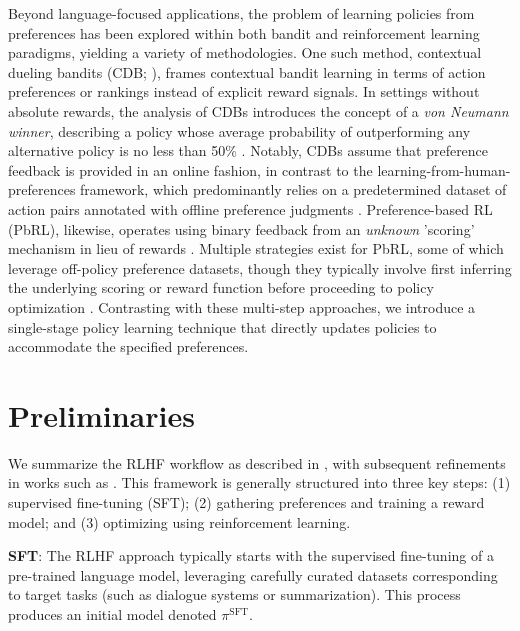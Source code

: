 Beyond language-focused applications, the problem of learning policies from preferences has been explored within both bandit and reinforcement learning paradigms, yielding a variety of methodologies. One such method, contextual dueling bandits (CDB; \cite{yue2012karmed,dudik2015contextual}), frames contextual bandit learning in terms of action preferences or rankings instead of explicit reward signals. In settings without absolute rewards, the analysis of CDBs introduces the concept of a \textit{von Neumann winner}, describing a policy whose average probability of outperforming any alternative policy is no less than 50\% \citep{dudik2015contextual}. Notably, CDBs assume that preference feedback is provided in an online fashion, in contrast to the learning-from-human-preferences framework, which predominantly relies on a predetermined dataset of action pairs annotated with offline preference judgments \citep{yan2022human}. Preference-based RL (PbRL), likewise, operates using binary feedback from an \textit{unknown} 'scoring' mechanism in lieu of rewards \citep{BusaFekete2014,ruiz2023dueling}. Multiple strategies exist for PbRL, some of which leverage off-policy preference datasets, though they typically involve first inferring the underlying scoring or reward function before proceeding to policy optimization \citep{jain2013learning,BusaFekete2014,christiano2017deep,sadigh2017active,kupcsik2018learning}. Contrasting with these multi-step approaches, we introduce a single-stage policy learning technique that directly updates policies to accommodate the specified preferences.

\section{Preliminaries}\label{section:prelims}

We summarize the RLHF workflow as described in \citeauthor{ziegler2020finetuning}, with subsequent refinements in works such as \citep{stiennon2022learning, bai2022training, ouyang2022training}. This framework is generally structured into three key steps: (1) supervised fine-tuning (SFT); (2) gathering preferences and training a reward model; and (3) optimizing using reinforcement learning.

\textbf{SFT}: The RLHF approach typically starts with the supervised fine-tuning of a pre-trained language model, leveraging carefully curated datasets corresponding to target tasks (such as dialogue systems or summarization). This process produces an initial model denoted $\pi^\text{SFT}$.

